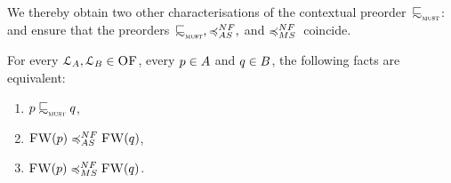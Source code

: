 We thereby obtain two other characterisations of the contextual preorder~$\testleqS$:
 and  ensure that the
preorders~$\testleqS, \asleqNF,$ and $\msleqNF$~coincide.
\begin{corollary}%
  \label{cor:asynleq-equals-bhvleq}
  For every $\mathcal{L}_A, \mathcal{L}_B \in \textsc{OF}$,
  every $p \in A$ and $q \in B$,
  the following facts are equivalent:
  \begin{enumerate}
  \item $\serverA \testleqS \serverB$,
  \item $\liftFW{\serverA} \asleqNF \liftFW{\serverB}$,
  \item $\liftFW{\serverA} \msleqNF \liftFW{\serverB}$.
  \end{enumerate}
\end{corollary}
